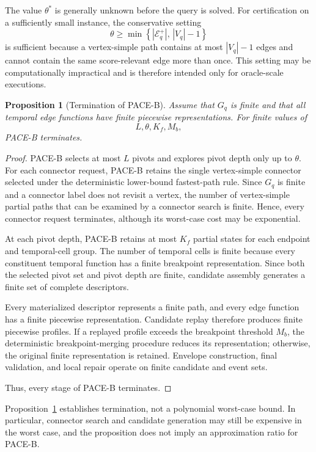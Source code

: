 \documentclass[a4paper,fleqn]{cas-dc}
\newtheorem{proposition}{Proposition}
\begin{document}
The value \(\theta^{*}\) is generally unknown before the query is solved. For
certification on a sufficiently small instance, the conservative setting
\[
\theta
\geq
\min
\left\{
|\mathcal{E}_q^{+}|,\,
|V_q|-1
\right\}
\]
is sufficient because a vertex-simple path contains at most \(|V_q|-1\)
edges and cannot contain the same score-relevant edge more than once. This
setting may be computationally impractical and is therefore intended only for
oracle-scale executions.

\begin{proposition}[Termination of PACE-B]
\label{prop:pace_b_termination}
Assume that \(G_q\) is finite and that all temporal edge functions have finite
piecewise representations. For finite values of
\[
L,\theta,K_f,M_b,
\]
PACE-B terminates.
\end{proposition}

\begin{proof}
PACE-B selects at most \(L\) pivots and explores pivot depth only up to
\(\theta\). For each connector request, PACE-B retains the single vertex-simple connector selected under the deterministic lower-bound fastest-path rule. Since \(G_q\) is finite and a connector label does
not revisit a vertex, the number of vertex-simple partial paths that can be
examined by a connector search is finite. Hence, every connector request
terminates, although its worst-case cost may be exponential.

At each pivot depth, PACE-B retains at most \(K_f\) partial states for each
endpoint and temporal-cell group. The number of temporal cells is finite
because every constituent temporal function has a finite breakpoint
representation. Since both the selected pivot set and pivot depth are finite,
candidate assembly generates a finite set of complete descriptors.

Every materialized descriptor represents a finite path, and every edge
function has a finite piecewise representation. Candidate replay therefore
produces finite piecewise profiles. If a replayed profile exceeds the
breakpoint threshold \(M_b\), the deterministic breakpoint-merging procedure
reduces its representation; otherwise, the original finite representation is
retained. Envelope construction, final validation, and local repair operate on
finite candidate and event sets.

Thus, every stage of PACE-B terminates.
\end{proof}

Proposition~\ref{prop:pace_b_termination} establishes termination, not a
polynomial worst-case bound. In particular, connector search and candidate
generation may still be expensive in the worst case, and the proposition does
not imply an approximation ratio for PACE-B.
\end{document}
